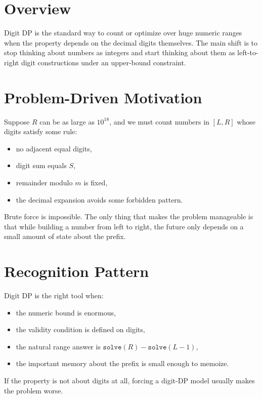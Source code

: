 \section*{Overview}

Digit DP is the standard way to count or optimize over huge numeric ranges when the property depends on the decimal
digits themselves. The main shift is to stop thinking about numbers as integers and start thinking about them as
left-to-right digit constructions under an upper-bound constraint.

\section*{Problem-Driven Motivation}

Suppose \(R\) can be as large as \(10^{18}\), and we must count numbers in \([L,R]\) whose digits satisfy some rule:

\begin{itemize}
  \item no adjacent equal digits,
  \item digit sum equals \(S\),
  \item remainder modulo \(m\) is fixed,
  \item the decimal expansion avoids some forbidden pattern.
\end{itemize}

Brute force is impossible. The only thing that makes the problem manageable is that while building a number from left to
right, the future only depends on a small amount of state about the prefix.

\section*{Recognition Pattern}

Digit DP is the right tool when:

\begin{itemize}
  \item the numeric bound is enormous,
  \item the validity condition is defined on digits,
  \item the natural range answer is \(\texttt{solve}(R) - \texttt{solve}(L-1)\),
  \item the important memory about the prefix is small enough to memoize.
\end{itemize}

If the property is not about digits at all, forcing a digit-DP model usually makes the problem worse.

